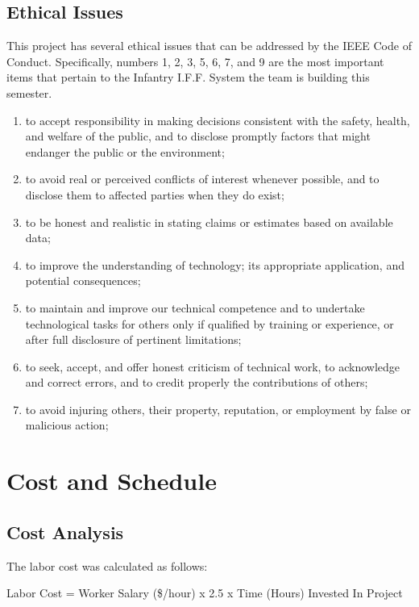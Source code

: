 \documentclass[letterpaper,10pt]{article}
\makeatletter
\newcommand{\skipitems}[1]{%
	\addtocounter{\@enumctr}{#1}%
}
\makeatother
\begin{document}
\begin{spacing}{1.15}
\subsection{Ethical Issues}
This project has several ethical issues that can be addressed by the IEEE Code of Conduct. Specifically, numbers 1, 2, 3, 5, 6, 7, and 9 are the most important items that pertain to the Infantry I.F.F. System the team is building this semester. 
\begin{enumerate}
\item to accept responsibility in making decisions consistent with the safety, health, and welfare of the public, and to disclose promptly factors that might endanger the public or the environment;
\item to avoid real or perceived conflicts of interest whenever possible, and to disclose them to affected parties when they do exist;
\item to be honest and realistic in stating claims or estimates based on available data;  
\skipitems{1}
\item to improve the understanding of technology; its appropriate application, and potential consequences;  
\item to maintain and improve our technical competence and to undertake technological tasks for others only if qualified by training or experience, or after full disclosure of pertinent limitations;  
\item to seek, accept, and offer honest criticism of technical work, to acknowledge and correct errors, and to credit properly the contributions of others;  
\skipitems{1}
\item to avoid injuring others, their property, reputation, or employment by false or malicious action;  
\end{enumerate}

\clearpage
\section{Cost and Schedule}

\subsection{Cost Analysis}
The labor cost was calculated as follows:

\begin{center}
	Labor Cost = Worker Salary (\$/hour) x 2.5 x Time (Hours) Invested In Project
\end{center}


\end{spacing}
\end{document}
